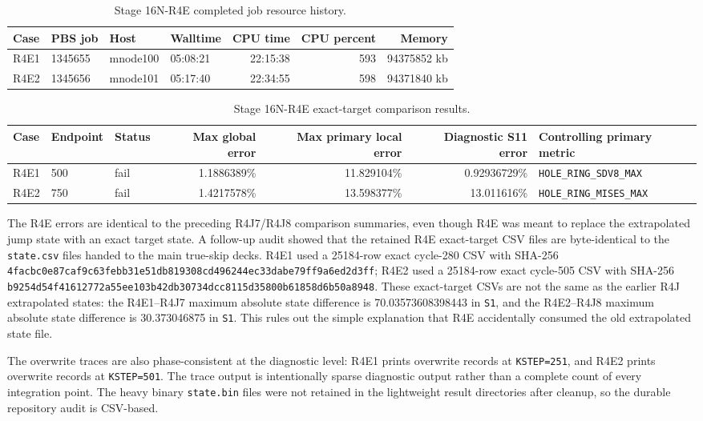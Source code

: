 \documentclass[11pt,a4paper]{article}
\newcommand{\code}[1]{\texttt{#1}}
\begin{document}
\begin{table}[H]
\centering
\caption{Stage 16N-R4E completed job resource history.}
\begin{tabular}{llllrrr}
\toprule
Case & PBS job & Host & Walltime & CPU time & CPU percent & Memory \\
\midrule
R4E1 & 1345655 & mnode100 & 05:08:21 & 22:15:38 & 593 & 94375852 kb \\
R4E2 & 1345656 & mnode101 & 05:17:40 & 22:34:55 & 598 & 94371840 kb \\
\bottomrule
\end{tabular}
\end{table}

\begin{table}[H]
\centering
\caption{Stage 16N-R4E exact-target comparison results.}
\begin{tabular}{lllrrrl}
\toprule
Case & Endpoint & Status & Max global error & Max primary local error & Diagnostic S11 error & Controlling primary metric \\
\midrule
R4E1 & 500 & fail & 1.1886389\% & 11.829104\% & 0.92936729\% & \code{HOLE\_RING\_SDV8\_MAX} \\
R4E2 & 750 & fail & 1.4217578\% & 13.598377\% & 13.011616\% & \code{HOLE\_RING\_MISES\_MAX} \\
\bottomrule
\end{tabular}
\end{table}

The R4E errors are identical to the preceding R4J7/R4J8 comparison summaries, even though R4E was meant to replace the extrapolated jump state with an exact target state. A follow-up audit showed that the retained R4E exact-target CSV files are byte-identical to the \code{state.csv} files handed to the main true-skip decks. R4E1 used a 25184-row exact cycle-280 CSV with SHA-256 \code{4facbc0e87caf9c63febb31e51db819308cd496244ec33dabe79ff9a6ed2d3ff}; R4E2 used a 25184-row exact cycle-505 CSV with SHA-256 \code{b9254d54f41612772a55ee103b42db30734dcc8115d35800b61858d6b50a8948}. These exact-target CSVs are not the same as the earlier R4J extrapolated states: the R4E1--R4J7 maximum absolute state difference is 70.03573608398443 in \code{S1}, and the R4E2--R4J8 maximum absolute state difference is 30.373046875 in \code{S1}. This rules out the simple explanation that R4E accidentally consumed the old extrapolated state file.

The overwrite traces are also phase-consistent at the diagnostic level: R4E1 prints overwrite records at \code{KSTEP=251}, and R4E2 prints overwrite records at \code{KSTEP=501}. The trace output is intentionally sparse diagnostic output rather than a complete count of every integration point. The heavy binary \code{state.bin} files were not retained in the lightweight result directories after cleanup, so the durable repository audit is CSV-based.
\end{document}
